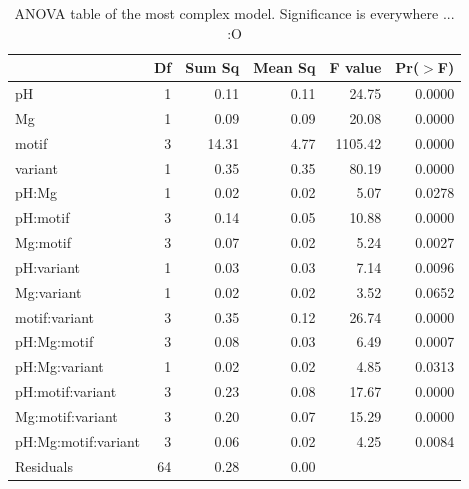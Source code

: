 \documentclass[]{tufte-handout}
\newenvironment{Shaded}{}{}
\newcommand{\KeywordTok}[1]{\textcolor[rgb]{0.00,0.44,0.13}{\textbf{{#1}}}}
\newcommand{\DataTypeTok}[1]{\textcolor[rgb]{0.56,0.13,0.00}{{#1}}}
\newcommand{\StringTok}[1]{\textcolor[rgb]{0.25,0.44,0.63}{{#1}}}
\newcommand{\NormalTok}[1]{{#1}}
\begin{document}
\begin{table}[ht]
\centering
\begin{tabular}{lrrrrr}
  \toprule
 & Df & Sum Sq & Mean Sq & F value & Pr($>$F) \\ 
  \midrule
pH                  & 1 & 0.11 & 0.11 & 24.75 & 0.0000 \\ 
  Mg                  & 1 & 0.09 & 0.09 & 20.08 & 0.0000 \\ 
  motif               & 3 & 14.31 & 4.77 & 1105.42 & 0.0000 \\ 
  variant             & 1 & 0.35 & 0.35 & 80.19 & 0.0000 \\ 
  pH:Mg               & 1 & 0.02 & 0.02 & 5.07 & 0.0278 \\ 
  pH:motif            & 3 & 0.14 & 0.05 & 10.88 & 0.0000 \\ 
  Mg:motif            & 3 & 0.07 & 0.02 & 5.24 & 0.0027 \\ 
  pH:variant          & 1 & 0.03 & 0.03 & 7.14 & 0.0096 \\ 
  Mg:variant          & 1 & 0.02 & 0.02 & 3.52 & 0.0652 \\ 
  motif:variant       & 3 & 0.35 & 0.12 & 26.74 & 0.0000 \\ 
  pH:Mg:motif         & 3 & 0.08 & 0.03 & 6.49 & 0.0007 \\ 
  pH:Mg:variant       & 1 & 0.02 & 0.02 & 4.85 & 0.0313 \\ 
  pH:motif:variant    & 3 & 0.23 & 0.08 & 17.67 & 0.0000 \\ 
  Mg:motif:variant    & 3 & 0.20 & 0.07 & 15.29 & 0.0000 \\ 
  pH:Mg:motif:variant & 3 & 0.06 & 0.02 & 4.25 & 0.0084 \\ 
  Residuals           & 64 & 0.28 & 0.00 &  &  \\ 
   \bottomrule
\end{tabular}
\caption{ANOVA table of the most complex model. Significance is everywhere ... :O} 
\end{table}

\begin{Shaded}
\end{Shaded}
\end{document}
